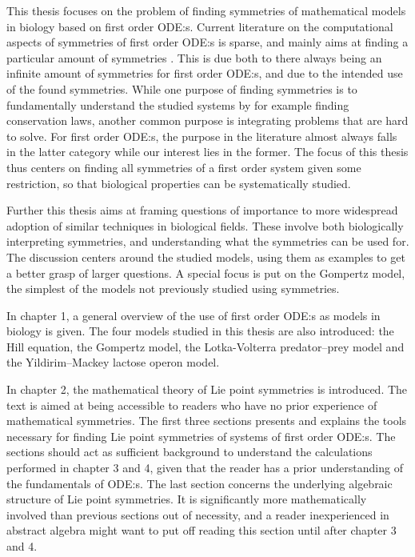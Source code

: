This thesis focuses on the problem of finding symmetries of mathematical models in biology based on first order ODE:s.
Current literature on the computational aspects of symmetries of first order ODE:s is sparse, and mainly aims at finding a particular amount of symmetries \cite{chebterrab1997computer,chebterrab1998patterns}. %
This is due both to there always being an infinite amount of symmetries for first order ODE:s, and due to the intended use of the found symmetries.
While one purpose of finding symmetries is to fundamentally understand the studied systems by for example finding conservation laws, another common purpose is integrating problems that are hard to solve.
For first order ODE:s, the purpose in the literature almost always falls in the latter category while our interest lies in the former.
The focus of this thesis thus centers on finding all symmetries of a first order system given some restriction, so that biological properties can be systematically studied.

Further this thesis aims at framing questions of importance to more widespread adoption of similar techniques in biological fields.
These involve both biologically interpreting symmetries, and understanding what the symmetries can be used for.
The discussion centers around the studied models, using them as examples to get a better grasp of larger questions.
A special focus is put on the Gompertz model, the simplest of the models not previously studied using symmetries.

In chapter 1, a general overview of the use of first order ODE:s as models in biology is given.
The four models studied in this thesis are also introduced: the Hill equation, the Gompertz model, the Lotka-Volterra predator--prey model and the Yildirim--Mackey lactose operon model.

In chapter 2, the mathematical theory of Lie point symmetries is introduced.
The text is aimed at being accessible to readers who have no prior experience of mathematical symmetries.
The first three sections presents and explains the tools necessary for finding Lie point symmetries of systems of first order ODE:s.
The sections should act as sufficient background to understand the calculations performed in chapter 3 and 4, given that the reader has a prior understanding of the fundamentals of ODE:s.
The last section concerns the underlying algebraic structure of Lie point symmetries.
It is significantly more mathematically involved than previous sections out of necessity, and a reader inexperienced in abstract algebra might want to put off reading this section until after chapter 3 and 4.

